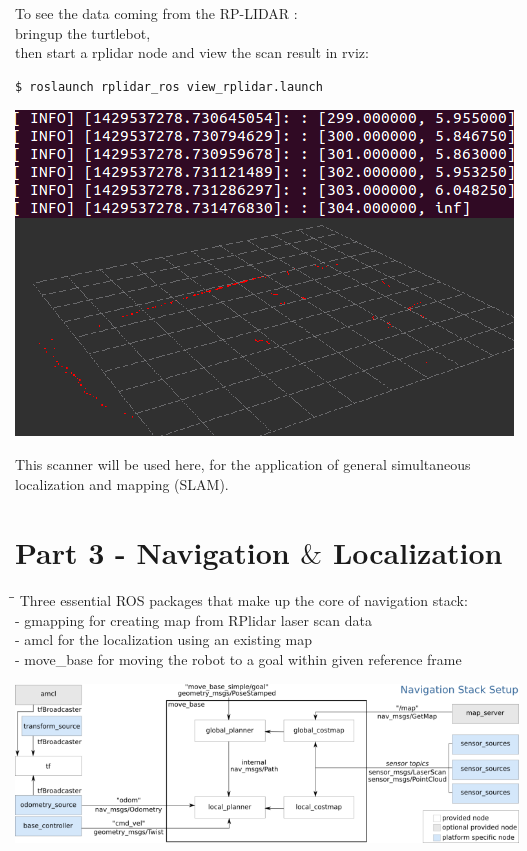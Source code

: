 \documentclass[10pt,a4paper]{article}
\begin{document}
To see the data coming from the RP-LIDAR :\\
bringup the turtlebot, \\
then start a rplidar node and view the scan result in rviz:
\begin{lstlisting}[frame=single] 
$ roslaunch rplidar_ros view_rplidar.launch
\end{lstlisting}

\begin{center}
\includegraphics[width=\textwidth]{images/infos+view.png}\\
\end{center}

This scanner will be used here, for the application of general simultaneous localization and mapping (SLAM).

\section{Part 3 - Navigation $\&$ Localization}
\begin{tabbing}
\hspace{1cm}\=\hspace{1cm}\=\kill
Three essential ROS packages that make up the core of navigation stack:	\\
\> - gmapping for creating map from RPlidar laser scan data \\
\> - amcl for the localization using an existing map \\
\> - move\_base for moving the robot to a goal within given reference frame \\
\end{tabbing}

\begin{center}
\includegraphics[width=\textwidth]{images/overview_small.png}
\end{center}
\end{document}
